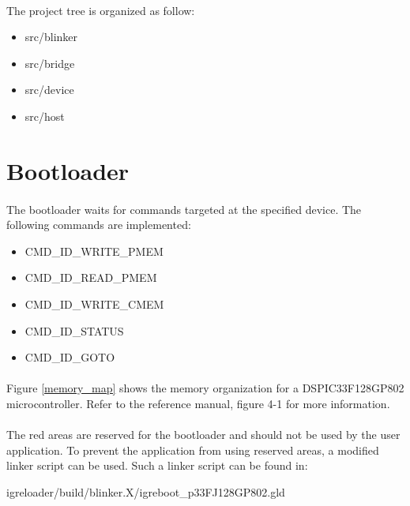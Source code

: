 \documentclass[a4paper, 11pt]{article}
\begin{document}
\paragraph{}
The project tree is organized as follow:
\begin{itemize}
\item src/blinker
\item src/bridge
\item src/device
\item src/host
\end{itemize}

\newpage
\section{Bootloader}
\paragraph{}
The bootloader waits for commands targeted at the specified device. The following commands are implemented:
\begin{itemize}
\item CMD\_ID\_WRITE\_PMEM
\item CMD\_ID\_READ\_PMEM
\item CMD\_ID\_WRITE\_CMEM
\item CMD\_ID\_STATUS
\item CMD\_ID\_GOTO
\end{itemize}

\paragraph{}
Figure \ref{memory_map} shows the memory organization for a DSPIC33F128GP802 microcontroller. Refer
to the reference manual, figure 4-1 for more information.
\paragraph{}
The red areas are reserved for the bootloader and should not be used by the user application. To prevent
the application from using reserved areas, a modified linker script can be used. Such a linker script can
be found in:
\begin{center}
igreloader/build/blinker.X/igreboot\_p33FJ128GP802.gld
\end{center}
\end{document}

